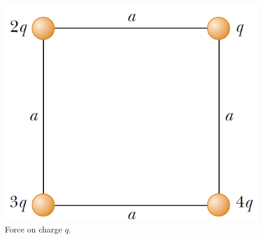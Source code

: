 \documentclass[12pt,a4paper]{article}
\begin{document}
\begin{figure}[H]
\centering
\includegraphics[scale=0.45]{FigureP23-21.png}
\caption{Force on charge $q$.}
\label{E-field-at-q}
\end{figure}


\end{document}
